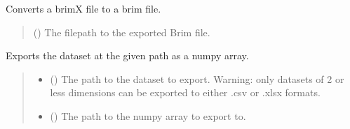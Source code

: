\documentclass[letterpaper,10pt,english]{sphinxmanual}
\begin{document}
\begin{fulllineitems}
\begin{fulllineitems}
\end{fulllineitems}


\begin{fulllineitems}
\label{\detokenize{source/_autosummary/HDF5_BLS.Wrapper:HDF5_BLS.Wrapper.export_brim}}
\pysigstartsignatures
\pysiglinewithargsret
{}
{}
{}
\pysigstopsignatures
\sphinxAtStartPar
Converts a brimX file to a brim file.
\begin{quote}\begin{description}
\sphinxAtStartPar
{} () \textendash{} The filepath to the exported Brim file.

\end{description}\end{quote}

\end{fulllineitems}


\begin{fulllineitems}
\label{\detokenize{source/_autosummary/HDF5_BLS.Wrapper:HDF5_BLS.Wrapper.export_dataset}}
\pysigstartsignatures
\pysiglinewithargsret
{}
{\sphinxparamcomma {}\sphinxparamcomma {}}
{}
\pysigstopsignatures
\sphinxAtStartPar
Exports the dataset at the given path as a numpy array.
\begin{quote}\begin{description}
\begin{itemize}
\item {} 
\sphinxAtStartPar
{} () \textendash{} The path to the dataset to export. Warning: only datasets of 2 or less dimensions can be exported to either .csv or .xlsx formats.

\item {} 
\sphinxAtStartPar
{} () \textendash{} The path to the numpy array to export to.


\end{itemize}
\end{description}
\end{quote}
\end{fulllineitems}
\end{fulllineitems}
\end{document}
